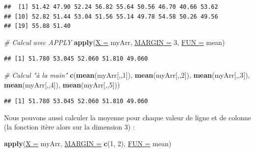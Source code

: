 \documentclass[twoside,symmetric]{book}
\newenvironment{Shaded}{}{}
\newcommand{\CommentTok}[1]{\textit{#1}}
\newcommand{\DataTypeTok}[1]{\underline{#1}}
\newcommand{\DecValTok}[1]{#1}
\newcommand{\KeywordTok}[1]{\textbf{#1}}
\newcommand{\NormalTok}[1]{#1}
\begin{document}
\begin{verbatim}
##  [1] 51.42 47.90 52.24 56.82 55.64 50.56 46.70 40.66 53.62
## [10] 52.82 51.44 53.04 51.56 55.14 49.78 54.58 50.26 49.56
## [19] 55.88 51.40
\end{verbatim}

\begin{Shaded}
\begin{Highlighting}[]
\CommentTok{# Calcul avec APPLY}
\KeywordTok{apply}\NormalTok{(}\DataTypeTok{X =}\NormalTok{ myArr, }\DataTypeTok{MARGIN =} \DecValTok{3}\NormalTok{, }\DataTypeTok{FUN =}\NormalTok{ mean)}
\end{Highlighting}
\end{Shaded}

\begin{verbatim}
## [1] 51.780 53.045 52.060 51.810 49.060
\end{verbatim}

\begin{Shaded}
\begin{Highlighting}[]
\CommentTok{# Calcul "à la main"}
\KeywordTok{c}\NormalTok{(}\KeywordTok{mean}\NormalTok{(myArr[,,}\DecValTok{1}\NormalTok{]), }\KeywordTok{mean}\NormalTok{(myArr[,,}\DecValTok{2}\NormalTok{]), }\KeywordTok{mean}\NormalTok{(myArr[,,}\DecValTok{3}\NormalTok{]), }
  \KeywordTok{mean}\NormalTok{(myArr[,,}\DecValTok{4}\NormalTok{]), }\KeywordTok{mean}\NormalTok{(myArr[,,}\DecValTok{5}\NormalTok{]))}
\end{Highlighting}
\end{Shaded}

\begin{verbatim}
## [1] 51.780 53.045 52.060 51.810 49.060
\end{verbatim}

Nous pouvons aussi calculer la moyenne pour chaque valeur de ligne et de colonne (la fonction itère alors sur la dimension 3) :

\begin{Shaded}
\begin{Highlighting}[]
\KeywordTok{apply}\NormalTok{(}\DataTypeTok{X =}\NormalTok{ myArr, }\DataTypeTok{MARGIN =} \KeywordTok{c}\NormalTok{(}\DecValTok{1}\NormalTok{, }\DecValTok{2}\NormalTok{), }\DataTypeTok{FUN =}\NormalTok{ mean)}
\end{Highlighting}
\end{Shaded}
\end{document}
